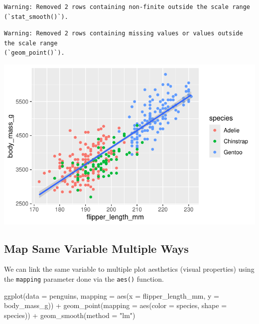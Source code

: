 \documentclass[
  letterpaper,
  DIV=11,
  numbers=noendperiod]{scrreprt}
\newenvironment{Shaded}{\begin{snugshade}}{\end{snugshade}}
\newcommand{\AttributeTok}[1]{\textcolor[rgb]{0.40,0.45,0.13}{#1}}
\newcommand{\FunctionTok}[1]{\textcolor[rgb]{0.28,0.35,0.67}{#1}}
\newcommand{\NormalTok}[1]{\textcolor[rgb]{0.00,0.23,0.31}{#1}}
\newcommand{\SpecialCharTok}[1]{\textcolor[rgb]{0.37,0.37,0.37}{#1}}
\newcommand{\StringTok}[1]{\textcolor[rgb]{0.13,0.47,0.30}{#1}}
\begin{document}
\begin{verbatim}
Warning: Removed 2 rows containing non-finite outside the scale range
(`stat_smooth()`).
\end{verbatim}

\begin{verbatim}
Warning: Removed 2 rows containing missing values or values outside the scale range
(`geom_point()`).
\end{verbatim}

\includegraphics{src/r-for-data-science/01-data-viz_files/figure-pdf/unnamed-chunk-10-1.pdf}

\subsection{Map Same Variable Multiple
Ways}\label{map-same-variable-multiple-ways}

We can link the same variable to multiple plot aesthetics (visual
properties) using the \texttt{mapping} parameter done via the
\texttt{aes()} function.

\begin{Shaded}
\begin{Highlighting}[]
\FunctionTok{ggplot}\NormalTok{(}\AttributeTok{data =}\NormalTok{ penguins,}
       \AttributeTok{mapping =} \FunctionTok{aes}\NormalTok{(}\AttributeTok{x =}\NormalTok{ flipper\_length\_mm, }\AttributeTok{y =}\NormalTok{ body\_mass\_g)) }\SpecialCharTok{+}
  \FunctionTok{geom\_point}\NormalTok{(}\AttributeTok{mapping =} \FunctionTok{aes}\NormalTok{(}\AttributeTok{color =}\NormalTok{ species, }\AttributeTok{shape =}\NormalTok{ species)) }\SpecialCharTok{+}
  \FunctionTok{geom\_smooth}\NormalTok{(}\AttributeTok{method =} \StringTok{"lm"}\NormalTok{)}
\end{Highlighting}
\end{Shaded}
\end{document}
